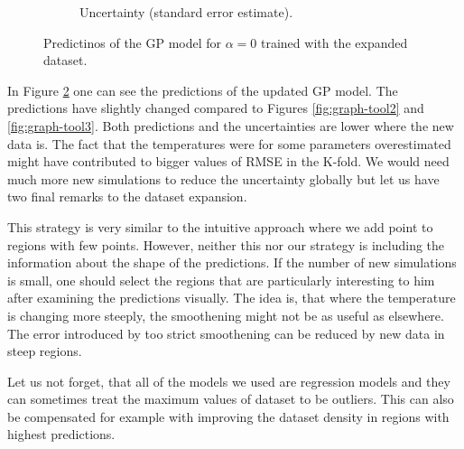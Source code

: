 \begin{figure}[ht]
\begin{subfigure}{0.49\textwidth}
		\caption{Uncertainty (standard error estimate).}
		\label{fig:gp-improved-ss}
	\end{subfigure}
	\caption{Predictinos of the GP model for $\alpha = 0$ trained with the expanded dataset.}
	\label{fig:gp-improved}
\end{figure}

In Figure \ref{fig:gp-improved} one can see the predictions of the updated GP model. The predictions have slightly changed compared to Figures \ref{fig:graph-tool2} and \ref{fig:graph-tool3}. Both predictions and the uncertainties are lower where the new data is. The fact that the temperatures were for some parameters overestimated might have contributed to bigger values of RMSE in the K-fold. We would need much more new simulations to reduce the uncertainty globally but let us have two final remarks to the dataset expansion.

This strategy is very similar to the intuitive approach where we add point to regions with few points. However, neither this nor our strategy is including the information about the shape of the predictions. If the number of new simulations is small, one should select the regions that are particularly interesting to him after examining the predictions visually. The idea is, that where the temperature is changing more steeply, the smoothening might not be as useful as elsewhere. The error introduced by too strict smoothening can be reduced by new data in steep regions.

Let us not forget, that all of the models we used are regression models and they can sometimes treat the maximum values of dataset to be outliers. This can also be compensated for example with improving the dataset density in regions with highest predictions.